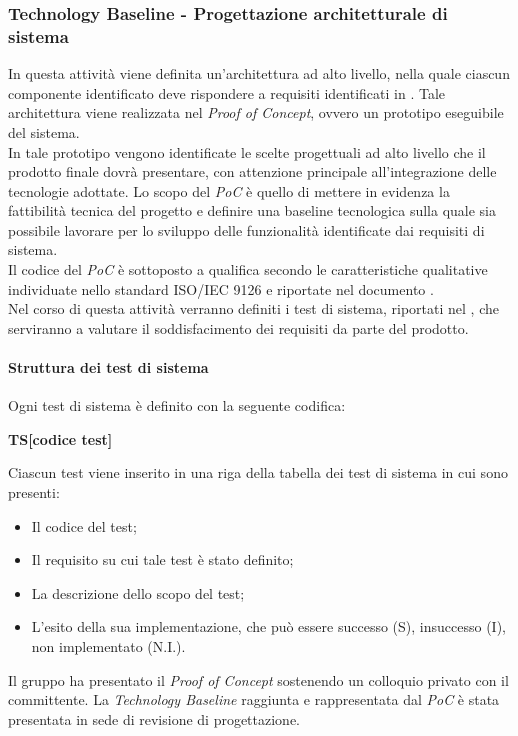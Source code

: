 \subsubsection{Technology Baseline - Progettazione architetturale di sistema}
In questa attività viene definita un'architettura ad alto livello, nella quale ciascun componente identificato deve rispondere a requisiti identificati in \docNameVersionAdR{}. Tale architettura viene realizzata nel \textit{Proof of Concept}, ovvero un prototipo eseguibile del sistema. \\In tale prototipo vengono identificate le scelte progettuali ad alto livello che il prodotto finale dovrà presentare, con attenzione principale all'integrazione delle tecnologie adottate. Lo scopo del \textit{PoC} è quello di mettere in evidenza la fattibilità tecnica del progetto e definire una baseline tecnologica sulla quale sia possibile lavorare per lo sviluppo delle funzionalità identificate dai requisiti di sistema.\\
Il codice del \textit{PoC} è sottoposto a qualifica secondo le caratteristiche qualitative individuate nello standard ISO/IEC 9126 e riportate nel documento \docNameVersionPdQ{}.\\
Nel corso di questa attività verranno definiti i test di sistema, riportati nel \docNameVersionPdQ{}, che serviranno a valutare il soddisfacimento dei requisiti da parte del prodotto. 
\paragraph{Struttura dei test di sistema}
Ogni test di sistema è definito con la seguente codifica:
\begin{center}
	\textbf{TS[codice test]}
\end{center}
Ciascun test viene inserito in una riga della tabella dei test di sistema in cui sono presenti:
\begin{itemize}
	\item  Il codice del test;
	\item  Il requisito su cui tale test è stato definito;
	\item  La descrizione dello scopo del test;
	\item  L’esito della sua implementazione, che può essere successo (S), insuccesso (I), non implementato (N.I.).
\end{itemize}
Il gruppo ha presentato il \textit{Proof of Concept} sostenendo un colloquio privato con il committente. La \textit{Technology Baseline} raggiunta e rappresentata dal \textit{PoC} è stata presentata in sede di revisione di progettazione.

